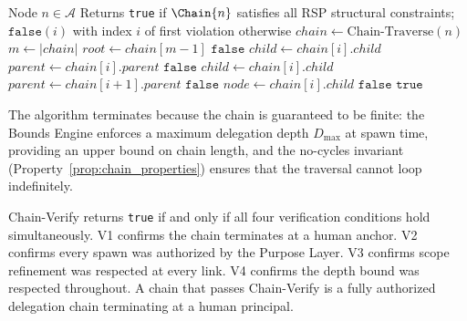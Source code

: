 \begin{algorithm}[htbp]
\caption{Chain-Verify($n$)}
\label{alg:chain_verify}
\begin{algorithmic}[1]
\Require Node $n \in \mathcal{A}$
\Ensure Returns \texttt{true} if $\Chain{n}$ satisfies all RSP structural constraints; $\texttt{false}$$(i)$ with index $i$ of first violation otherwise
\State $chain \gets \text{Chain-Traverse}(n)$
\State $m \gets |chain|$
\Statex
{}
\State $root \gets chain[m-1]$
    \State \Return $\texttt{false}$ 
\EndIf
\Statex
{}
    \State $child \leftarrow chain[i].child$
    \State $parent \leftarrow chain[i].parent$
        \State \Return $\texttt{false}$ 
    \EndIf
\EndFor
\Statex
{}
    \State $child \leftarrow chain[i].child$
    \State $parent \leftarrow chain[i+1].parent$
        \State \Return $\texttt{false}$ 
    \EndIf
\EndFor
\Statex
{}
    \State $node \gets chain[i].child$
        \State \Return $\texttt{false}$ 
    \EndIf
\EndFor
\State \Return $\texttt{true}$
\end{algorithmic}
\end{algorithm}

The algorithm terminates because the chain is guaranteed to be finite: the Bounds Engine enforces a maximum delegation depth $D_{\max}$ at spawn time, providing an upper bound on chain length, and the no-cycles invariant (Property~\ref{prop:chain_properties}) ensures that the traversal cannot loop indefinitely.

Chain-Verify returns \texttt{true} if and only if all four verification conditions hold simultaneously. V1 confirms the chain terminates at a human anchor. V2 confirms every spawn was authorized by the Purpose Layer. V3 confirms scope refinement was respected at every link. V4 confirms the depth bound was respected throughout. A chain that passes Chain-Verify is a fully authorized delegation chain terminating at a human principal.

